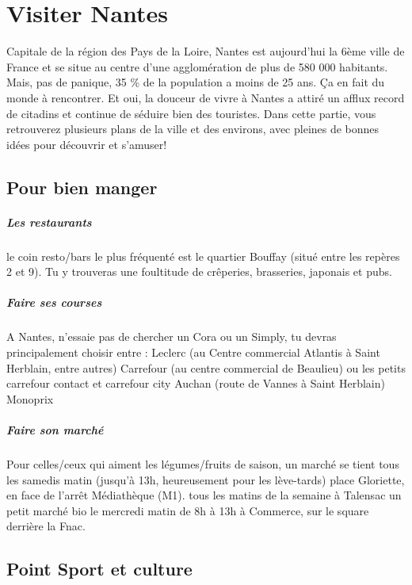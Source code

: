 \chapter{Visiter Nantes}\trad

Capitale de la région des Pays de la Loire, Nantes est aujourd'hui la 6ème ville de France et se situe au centre d'une agglomération de plus de 580 000 habitants.
Mais, pas de panique, 35 \% de la population a moins de 25 ans.
Ça en fait du monde à rencontrer.
Et oui, la douceur de vivre à Nantes a attiré un afflux record de citadins et continue de séduire bien des touristes.
Dans cette partie, vous retrouverez plusieurs plans de la ville et des environs, avec pleines de bonnes idées pour découvrir et s'amuser!

\section{Pour bien manger}\trad

\paragraph{Les restaurants} le coin resto/bars le plus fréquenté est le quartier Bouffay (situé entre les repères 2 et 9).
Tu y trouveras une foultitude de crêperies, brasseries, japonais et pubs.
\paragraph{Faire ses courses} A Nantes, n'essaie pas de chercher un Cora ou un Simply, tu devras principalement choisir entre :
Leclerc (au Centre commercial Atlantis à Saint Herblain, entre autres)
Carrefour (au centre commercial de Beaulieu) ou les petits carrefour contact et carrefour city
Auchan (route de Vannes à Saint Herblain)
Monoprix
\paragraph{Faire son marché} Pour celles/ceux qui aiment les légumes/fruits de saison, un marché se tient
tous les samedis matin (jusqu'à 13h, heureusement pour les lève-tards) place Gloriette, en face de l'arrêt Médiathèque (M1).
tous les matins de la semaine à Talensac
un petit marché bio le mercredi matin de 8h à 13h à Commerce, sur le square derrière la Fnac.

\section{Point Sport et culture}\trad
